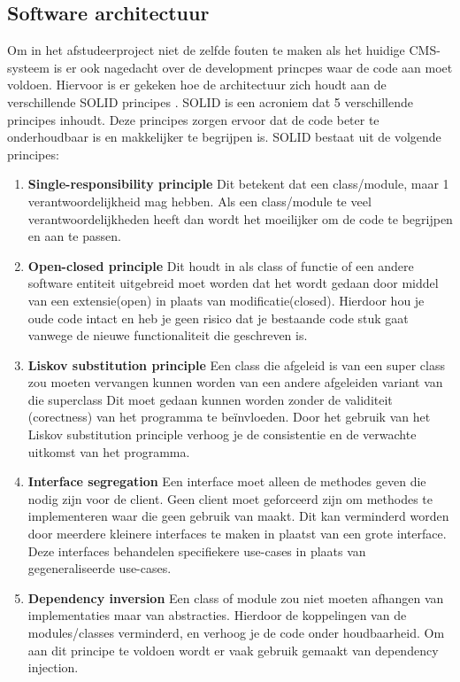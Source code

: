 \subsection{Software architectuur}
\label{subsecion:SoftwareArhitectuur}
Om in het afstudeerproject niet de zelfde fouten te maken als het huidige \gls{CMS}-systeem is er ook nagedacht over de development princpes waar de code aan moet voldoen.
Hiervoor is er gekeken hoe de architectuur zich houdt aan de verschillende SOLID principes \parencite{SOLID}. 
SOLID is een acroniem dat 5 verschillende principes inhoudt.
Deze principes zorgen ervoor dat de code beter te onderhoudbaar is en makkelijker te begrijpen is.
SOLID bestaat uit de volgende principes:

\begin{enumerate}
    \item \textbf{Single-responsibility principle}
    Dit betekent dat een class\slash module, maar 1 verantwoordelijkheid mag hebben.
    Als een class\slash module te veel verantwoordelijkheden heeft dan wordt het moeilijker om de code te begrijpen en aan te passen.

    \item \textbf{Open-closed principle}
    Dit houdt in als class of functie of een andere software entiteit uitgebreid moet worden dat het wordt gedaan door middel van een extensie(open) in plaats van modificatie(closed).
    Hierdoor hou je oude code intact en heb je geen risico dat je bestaande code stuk gaat vanwege de nieuwe functionaliteit die geschreven is. 
        
    \item \textbf{Liskov substitution principle}
    Een class die afgeleid is van een super class zou moeten vervangen kunnen worden van een andere afgeleiden variant van die superclass
    Dit moet gedaan kunnen worden zonder de validiteit (corectness) van het programma te beïnvloeden.
    Door het gebruik van het Liskov substitution principle verhoog je de consistentie en de verwachte uitkomst van het programma.

    \item \textbf{Interface segregation} 
    Een interface moet alleen de methodes geven die nodig zijn voor de client. 
    Geen client moet geforceerd zijn om methodes te implementeren waar die geen gebruik van maakt.
    Dit kan verminderd worden door meerdere kleinere interfaces te maken in plaatst van een grote interface.
    Deze interfaces behandelen specifiekere use-cases in plaats van gegeneraliseerde use-cases.
    \item \textbf{Dependency inversion} 
    Een class of module zou niet moeten afhangen van implementaties maar van abstracties.
    Hierdoor de koppelingen van de modules/classes verminderd, en verhoog je de code onder houdbaarheid.
    Om aan dit principe te voldoen wordt er vaak gebruik gemaakt van dependency injection.
\end{enumerate}

